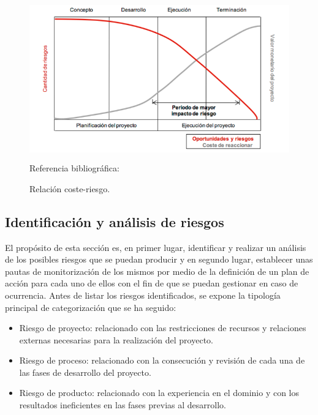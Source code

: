 \documentclass[12pt,a4paper, twoside]{report}
\begin{document}
	\begin{figure}[!ht]   
		\caption{Relación coste-riesgo.} 
		\begin{center} 
	 		\includegraphics[width=16cm,height=7cm]{Images/planning/cost_risk} \\
			\label{fig:plannig-cost-risk} 
			Referencia bibliográfica: \cite{incibe:GAGR}
		\end{center}  
	\end{figure}  
		
	\subsection{Identificación y análisis de riesgos}
	
	El propósito de esta sección es, en primer lugar, identificar y realizar un análisis de los posibles riesgos que se puedan producir y en segundo lugar, establecer unas pautas de monitorización de los mismos por medio de la definición de un plan de acción para cada uno de ellos con el fin de que se puedan gestionar en caso de ocurrencia. Antes de listar los riesgos identificados, se expone la tipología principal de categorización que se ha seguido:
	
	\begin{itemize}
		\item Riesgo de proyecto: relacionado con las restricciones de recursos y relaciones externas necesarias para la realización del proyecto.
		\item Riesgo de proceso: relacionado con la consecución y revisión de cada una de las fases de desarrollo del proyecto.
		\item Riesgo de producto: relacionado con la experiencia en el dominio y con los resultados ineficientes en las fases previas al desarrollo.
	\end{itemize}
	
\end{document}
